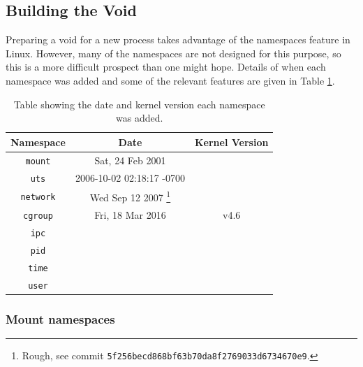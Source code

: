 \documentclass[sigplan]{acmart}
\begin{document}
\subsection{Building the Void}

Preparing a void for a new process takes advantage of the namespaces feature in Linux. However, many of the namespaces are not designed for this purpose, so this is a more difficult prospect than one might hope. Details of when each namespace was added and some of the relevant features are given in Table \ref{tab:namespaces}.

\begin{table}
    \centering
    \begin{tabular}{c|c|c}
        Namespace & Date & Kernel Version \\ \hline

        \texttt{mount}    & Sat, 24 Feb 2001 \citep{viro_patchcft_2001} &\\

        \texttt{uts}      & 2006-10-02 02:18:17 -0700 & \\
        
        \texttt{network}  & Wed Sep 12 2007 \footnote{Rough, see commit \texttt{5f256becd868bf63b70da8f2769033d6734670e9}.} &\\
        
        \texttt{cgroup}   & Fri, 18 Mar 2016 \citep{heo_git_2016} & v4.6 \citep{torvalds_linux_2016} \\

        \texttt{ipc}      & &\\

        \texttt{pid}      & &\\

        \texttt{time}     & &\\

        \texttt{user}     & &
    \end{tabular}
    \caption{Table showing the date and kernel version each namespace was added.}
    \label{tab:namespaces}
\end{table}

\subsubsection{Mount namespaces}
\end{document}
